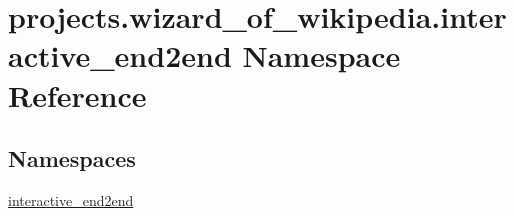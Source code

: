 \hypertarget{namespaceprojects_1_1wizard__of__wikipedia_1_1interactive__end2end}{}\section{projects.\+wizard\+\_\+of\+\_\+wikipedia.\+interactive\+\_\+end2end Namespace Reference}
\label{namespaceprojects_1_1wizard__of__wikipedia_1_1interactive__end2end}
\subsection*{Namespaces}
\begin{DoxyCompactItemize}
\item 
 \hyperlink{namespaceprojects_1_1wizard__of__wikipedia_1_1interactive__end2end_1_1interactive__end2end}{interactive\+\_\+end2end}
\end{DoxyCompactItemize}

